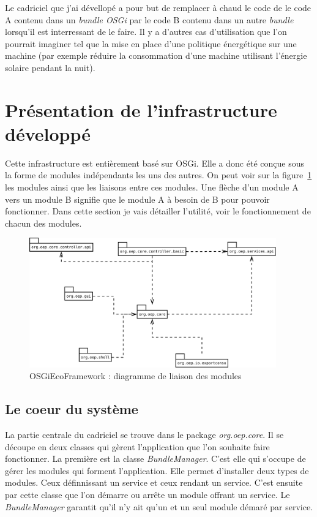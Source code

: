\documentclass[a4paper, 11pt]{report}
\begin{document}
Le cadriciel que j'ai dévellopé a pour but de remplacer à chaud le code de le code A contenu dans un \textit{bundle OSGi} par le code B contenu dans un autre \textit{bundle} lorsqu'il est interressant de le faire. Il y a d'autres cas d'utilisation que l'on pourrait imaginer tel que la mise en place d'une politique énergétique sur une machine (par exemple réduire la consommation d'une machine utilisant l'énergie solaire pendant la nuit).

	\section{Présentation de l'infrastructure développé}
Cette infrastructure est entièrement basé sur OSGi. Elle a donc été conçue sous la forme de modules indépendants les uns des autres. On peut voir sur la figure~\ref{BdlDiag} les modules ainsi que les liaisons entre ces modules. Une flèche d'un module A vers un module B signifie que le module A à besoin de B pour pouvoir fonctionner. Dans cette section je vais détailler l'utilité, voir le fonctionnement de chacun des modules.
	
\begin{figure}
	\centering
	\includegraphics[width=0.95\textwidth]{figures/EcoPattern_Bundle_Diagramme}
	\caption{OSGiEcoFramework : diagramme de liaison des modules}
	\label{BdlDiag}
\end{figure}
\subsection{Le coeur du système}
La partie centrale du cadriciel se trouve dans le package \textit{org.oep.core}. Il se découpe en deux classes qui gèrent l'application que l'on souhaite faire fonctionner. La première est la classe \textit{BundleManager}. C'est elle qui s'occupe de gérer les modules qui forment l'application. Elle permet d'installer deux types de modules. Ceux définnissant un service et ceux rendant un service. C'est ensuite par cette classe que l'on démarre ou arrête un module offrant un service. Le \textit{BundleManager} garantit qu'il n'y ait qu'un et un seul module démaré par service.
\end{document}
